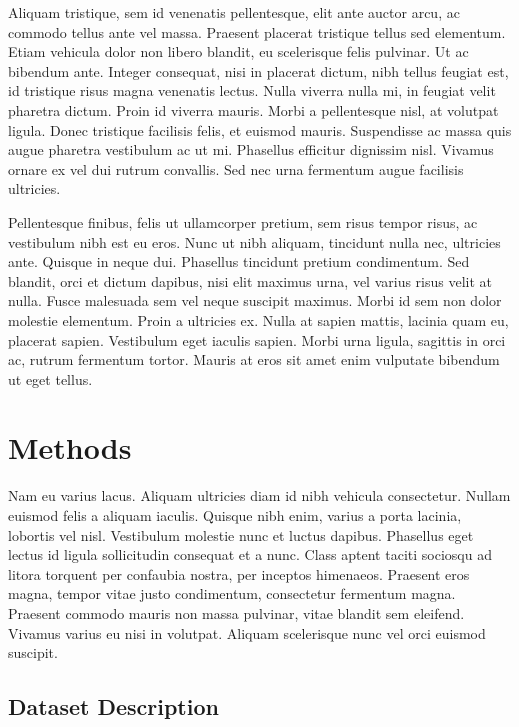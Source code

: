\documentclass{article}
\begin{document}
Aliquam tristique, sem id venenatis pellentesque, elit ante auctor arcu,
ac commodo tellus ante vel massa. Praesent placerat tristique tellus sed
elementum. Etiam vehicula dolor non libero blandit, eu scelerisque felis
pulvinar. Ut ac bibendum ante. Integer consequat, nisi in placerat
dictum, nibh tellus feugiat est, id tristique risus magna venenatis
lectus. Nulla viverra nulla mi, in feugiat velit pharetra dictum. Proin
id viverra mauris. Morbi a pellentesque nisl, at volutpat ligula. Donec
tristique facilisis felis, et euismod mauris. Suspendisse ac massa quis
augue pharetra vestibulum ac ut mi. Phasellus efficitur dignissim nisl.
Vivamus ornare ex vel dui rutrum convallis. Sed nec urna fermentum augue
facilisis ultricies.

Pellentesque finibus, felis ut ullamcorper pretium, sem risus tempor
risus, ac vestibulum nibh est eu eros. Nunc ut nibh aliquam, tincidunt
nulla nec, ultricies ante. Quisque in neque dui. Phasellus tincidunt
pretium condimentum. Sed blandit, orci et dictum dapibus, nisi elit
maximus urna, vel varius risus velit at nulla. Fusce malesuada sem vel
neque suscipit maximus. Morbi id sem non dolor molestie elementum. Proin
a ultricies ex. Nulla at sapien mattis, lacinia quam eu, placerat
sapien. Vestibulum eget iaculis sapien. Morbi urna ligula, sagittis in
orci ac, rutrum fermentum tortor. Mauris at eros sit amet enim vulputate
bibendum ut eget tellus.

\hypertarget{methods}{%
\section{Methods}\label{methods}}

Nam eu varius lacus. Aliquam ultricies diam id nibh vehicula
consectetur. Nullam euismod felis a aliquam iaculis. Quisque nibh enim,
varius a porta lacinia, lobortis vel nisl. Vestibulum molestie nunc et
luctus dapibus. Phasellus eget lectus id ligula sollicitudin consequat
et a nunc. Class aptent taciti sociosqu ad litora torquent per confaubia
nostra, per inceptos himenaeos. Praesent eros magna, tempor vitae justo
condimentum, consectetur fermentum magna. Praesent commodo mauris non
massa pulvinar, vitae blandit sem eleifend. Vivamus varius eu nisi in
volutpat. Aliquam scelerisque nunc vel orci euismod suscipit.

\hypertarget{dataset-description}{%
\subsection{Dataset Description}\label{dataset-description}}
\end{document}
